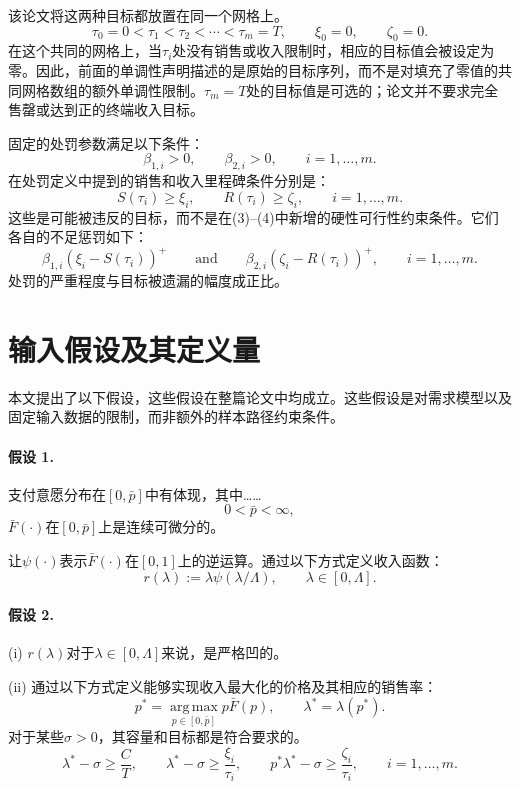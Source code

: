 \documentclass{article}
\begin{document}
该论文将这两种目标都放置在同一个网格上。
\[
\tau_0=0<\tau_1<\tau_2<\cdots<\tau_m=T,
\qquad \xi_0=0,\qquad\zeta_0=0.
\]
在这个共同的网格上，当$\tau_i$处没有销售或收入限制时，相应的目标值会被设定为零。因此，前面的单调性声明描述的是原始的目标序列，而不是对填充了零值的共同网格数组的额外单调性限制。$\tau_m=T$处的目标值是可选的；论文并不要求完全售罄或达到正的终端收入目标。

固定的处罚参数满足以下条件：
\[
\beta_{1,i}>0,\qquad\beta_{2,i}>0,
\qquad i=1,\ldots,m.
\]
在处罚定义中提到的销售和收入里程碑条件分别是：
\[
S(\tau_i)\ge\xi_i,
\qquad R(\tau_i)\ge\zeta_i,
\qquad i=1,\ldots,m.
\]
这些是可能被违反的目标，而不是在(3)--(4)中新增的硬性可行性约束条件。它们各自的不足惩罚如下：
\begin{equation}
\beta_{1,i}(\xi_i-S(\tau_i))^+
\qquad\text{and}\qquad
\beta_{2,i}(\zeta_i-R(\tau_i))^+,
\qquad i=1,\ldots,m.
\tag{2}
\end{equation}
处罚的严重程度与目标被遗漏的幅度成正比。

\section*{输入假设及其定义量}

本文提出了以下假设，这些假设在整篇论文中均成立。这些假设是对需求模型以及固定输入数据的限制，而非额外的样本路径约束条件。

\paragraph{假设 1.}
支付意愿分布在$[0,\bar p]$中有体现，其中……
\[
0<\bar p<\infty,
\]
$\bar F(\cdot)$在$[0,\bar p]$上是连续可微分的。

让$\psi(\cdot)$表示$\bar F(\cdot)$在$[0,1]$上的逆运算。通过以下方式定义收入函数：
\[
r(\lambda):=\lambda\psi(\lambda/\Lambda),
\qquad \lambda\in[0,\Lambda].
\]

\paragraph{假设 2.}
(i) $r(\lambda)$对于$\lambda\in[0,\Lambda]$来说，是严格凹的。

(ii) 通过以下方式定义能够实现收入最大化的价格及其相应的销售率：
\[
p^*=\operatorname*{arg\,max}_{p\in[0,\bar p]}p\bar F(p),
\qquad \lambda^*=\lambda(p^*).
\]
对于某些$\sigma>0$，其容量和目标都是符合要求的。
\[
\lambda^*-\sigma\ge\frac{C}{T},
\qquad
\lambda^*-\sigma\ge\frac{\xi_i}{\tau_i},
\qquad
p^*\lambda^*-\sigma\ge\frac{\zeta_i}{\tau_i},
\qquad i=1,\ldots,m.
\]
\end{document}
